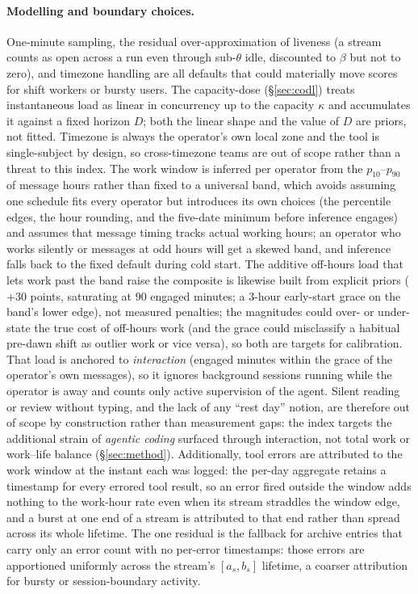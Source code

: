 \documentclass[10pt,twocolumn]{article}
\begin{document}
\paragraph{Modelling and boundary choices.} One-minute sampling, the residual
over-approximation of liveness (a stream counts as open across a run even through
sub-$\theta$ idle, discounted to $\beta$ but not to zero), and timezone handling
are all defaults that could materially move scores for shift workers or bursty
users. The capacity-dose (\S\ref{sec:codl}) treats instantaneous load as linear
in concurrency up to the capacity $\kappa$ and accumulates it against a fixed
horizon $D$; both the linear shape and the value of $D$ are priors, not fitted.
Timezone is always the operator's own local zone and the tool is
single-subject by design, so cross-timezone teams are out of scope rather than a
threat to this index. The work window is inferred per operator from the
$p_{10}$--$p_{90}$ of message hours rather than fixed to a universal band,
which avoids assuming one schedule fits every operator but introduces its own
choices (the percentile edges, the hour rounding, and the five-date minimum
before inference engages) and
assumes that message timing tracks actual working hours; an operator who works
silently or messages at odd hours will get a skewed band, and inference falls
back to the fixed default during cold start. The additive off-hours load that
lets work past the band raise the composite is likewise built from explicit
priors ($+30$ points, saturating at $90$ engaged minutes; a $3$-hour early-start
grace on the band's lower edge), not measured penalties; the magnitudes could
over- or under-state the true cost of off-hours work (and the grace could
misclassify a habitual pre-dawn shift as outlier work or vice versa), so both
are targets for calibration. That load is anchored to \emph{interaction} (engaged
minutes within the grace of the operator's own messages), so it ignores
background sessions running while the operator is away and counts only active
supervision of the agent. Silent reading or review without typing, and the lack
of any ``rest day'' notion, are therefore out of scope by construction rather
than measurement gaps: the index targets the additional strain of \emph{agentic
coding} surfaced through interaction, not total work or work--life balance
(\S\ref{sec:method}). Additionally,
tool errors are attributed to the work window at the instant each was logged:
the per-day aggregate retains a timestamp for every errored tool result, so an
error fired outside the window adds nothing to the work-hour rate even when its
stream straddles the window edge, and a burst at one end of a stream is
attributed to that end rather than spread across its whole lifetime. The one
residual is the fallback for archive entries that carry only an error count with
no per-error timestamps: those errors are apportioned uniformly across the
stream's $[a_s,b_s]$ lifetime, a coarser attribution for bursty or
session-boundary activity.
\end{document}
